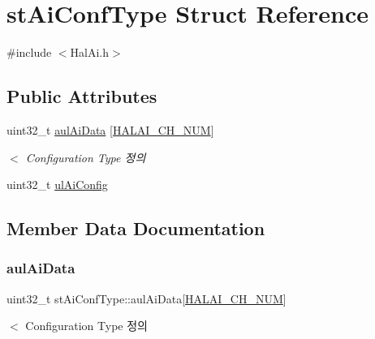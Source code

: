 \hypertarget{structst_ai_conf_type}{}\section{st\+Ai\+Conf\+Type Struct Reference}
\label{structst_ai_conf_type}


{\ttfamily \#include $<$Hal\+Ai.\+h$>$}

\subsection*{Public Attributes}
\begin{DoxyCompactItemize}
\item 
uint32\+\_\+t \mbox{\hyperlink{structst_ai_conf_type_a0c89a188c4d32b92d2db79cc0ad4728b}{aul\+Ai\+Data}} \mbox{[}\mbox{\hyperlink{_hal_ai_8h_ad1dcdbb982b361f20d308cbf2d496560}{H\+A\+L\+A\+I\+\_\+\+C\+H\+\_\+\+N\+UM}}\mbox{]}
\begin{DoxyCompactList}\small\item\em $<$ Configuration Type 정의 \end{DoxyCompactList}\item 
uint32\+\_\+t \mbox{\hyperlink{structst_ai_conf_type_a3583ab2f12cfddd6ed4156ebc8c9f0d0}{ul\+Ai\+Config}}
\end{DoxyCompactItemize}


\subsection{Member Data Documentation}
\mbox{\label{structst_ai_conf_type_a0c89a188c4d32b92d2db79cc0ad4728b}} 
\subsubsection{\texorpdfstring{aul\+Ai\+Data}{aulAiData}}
{\footnotesize\ttfamily uint32\+\_\+t st\+Ai\+Conf\+Type\+::aul\+Ai\+Data\mbox{[}\mbox{\hyperlink{_hal_ai_8h_ad1dcdbb982b361f20d308cbf2d496560}{H\+A\+L\+A\+I\+\_\+\+C\+H\+\_\+\+N\+UM}}\mbox{]}}



$<$ Configuration Type 정의 

\mbox{\label{structst_ai_conf_type_a3583ab2f12cfddd6ed4156ebc8c9f0d0}} 
